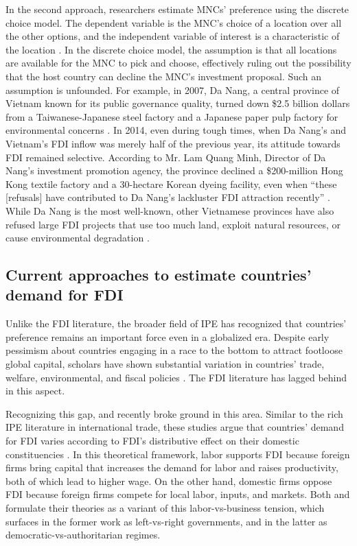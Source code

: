 In the second approach, researchers estimate MNCs' preference using the discrete
choice model. The dependent variable is the MNC's choice of a location over all
the other options, and the independent variable of interest is a characteristic
of the location \citep{Arauzo-Carod2010}. In the discrete choice model, the
assumption is that all locations are available for the MNC to pick and choose,
effectively ruling out the possibility that the host country can decline the
MNC's investment proposal. Such an assumption is unfounded. For example, in
2007, Da Nang, a central province of Vietnam known for its public governance
quality, turned down \$2.5 billion dollars from a Taiwanese-Japanese steel
factory and a Japanese paper pulp factory for environmental concerns
\citep{HDung2007}. In 2014, even during tough times, when Da Nang's and
Vietnam's FDI inflow was merely half of the previous year, its attitude towards
FDI remained selective. According to Mr. Lam Quang Minh, Director of Da Nang's
investment promotion agency, the province declined a \$200-million Hong Kong
textile factory and a 30-hectare Korean dyeing facility, even when ``these
[refusals] have contributed to Da Nang's lackluster FDI attraction recently''
\citep{HaiChau2015}. While Da Nang is the most well-known, other Vietnamese
provinces have also refused large FDI projects that use too much land, exploit
natural resources, or cause environmental degradation \citep{QuocHung2015}.

\subsection{Current approaches to estimate countries' demand for FDI}

Unlike the FDI literature, the broader field of IPE has recognized that
countries' preference remains an important force even in a globalized era.
Despite early pessimism about countries engaging in a race to the bottom to
attract footloose global capital, scholars have shown substantial variation in
countries' trade, welfare, environmental, and fiscal policies
\citep{Drezner2001}. The FDI literature has lagged behind in this aspect.

Recognizing this gap, \citet{Pinto2013} and \citet{Pandya2016} recently broke
ground in this area. Similar to the rich IPE literature in international trade,
these studies argue that countries' demand for FDI varies according to FDI's
distributive effect on their domestic constituencies \citep{Broz2001,
  Milner2005a}. In this theoretical framework, labor supports FDI because
foreign firms bring capital that increases the demand for labor and raises
productivity, both of which lead to higher wage. On the other hand, domestic
firms oppose FDI because foreign firms compete for local labor, inputs, and
markets. Both \citet{Pinto2013} and \citet{Pandya2016} formulate their theories
as a variant of this labor-vs-business tension, which surfaces in the former
work as left-vs-right governments, and in the latter as
democratic-vs-authoritarian regimes.

